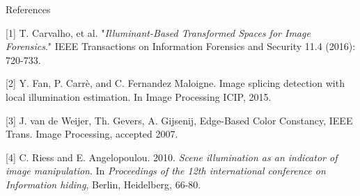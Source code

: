 \begin{tframe}{References}

\begin{small}

[1] T. Carvalho, et al. "\emph{Illuminant-Based Transformed Spaces for Image Forensics}." IEEE Transactions on Information Forensics and Security 11.4 (2016): 720-733.

\vspace{0.1in}

[2] Y. Fan, P. Carrè, and C. Fernandez Maloigne. Image splicing detection with local illumination estimation. In Image Processing ICIP, 2015.

\vspace{0.1in}

[3] J. van de Weijer, Th. Gevers, A. Gijsenij, Edge-Based Color Constancy, IEEE Trans. Image Processing, accepted 2007. 

\vspace{0.1in}

[4] C. Riess and E. Angelopoulou. 2010. \emph{Scene illumination as an indicator of image manipulation}. In \emph{Proceedings of the 12th international conference on Information hiding}, Berlin, Heidelberg, 66-80.

\end{small}

\end{tframe}